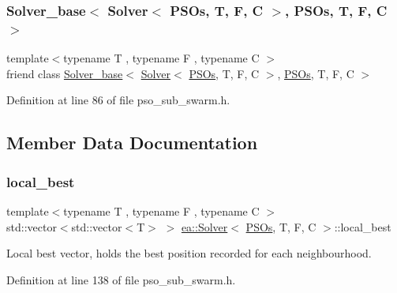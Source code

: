 \subsubsection{\texorpdfstring{Solver\+\_\+base$<$ Solver$<$ P\+S\+Os, T, F, C $>$, P\+S\+Os, T, F, C $>$}{Solver\_base< Solver< PSOs, T, F, C >, PSOs, T, F, C >}}
{\footnotesize\ttfamily template$<$typename T , typename F , typename C $>$ \\
friend class \hyperlink{classea_1_1_solver__base}{Solver\+\_\+base}$<$ \hyperlink{classea_1_1_solver}{Solver}$<$ \hyperlink{structea_1_1_p_s_os}{P\+S\+Os}, T, F, C $>$, \hyperlink{structea_1_1_p_s_os}{P\+S\+Os}, T, F, C $>$\hspace{0.3cm}{\ttfamily [friend]}}



Definition at line 86 of file pso\+\_\+sub\+\_\+swarm.\+h.



\subsection{Member Data Documentation}
\mbox{\label{classea_1_1_solver_3_01_p_s_os_00_01_t_00_01_f_00_01_c_01_4_afa2eb13f0e5028ba4aa96f7e29b62e9c}} 
\subsubsection{\texorpdfstring{local\+\_\+best}{local\_best}}
{\footnotesize\ttfamily template$<$typename T , typename F , typename C $>$ \\
std\+::vector$<$std\+::vector$<$T$>$ $>$ \hyperlink{classea_1_1_solver}{ea\+::\+Solver}$<$ \hyperlink{structea_1_1_p_s_os}{P\+S\+Os}, T, F, C $>$\+::local\+\_\+best\hspace{0.3cm}{\ttfamily [private]}}



Local best vector, holds the best position recorded for each neighbourhood. 



Definition at line 138 of file pso\+\_\+sub\+\_\+swarm.\+h.

\mbox{\label{classea_1_1_solver_3_01_p_s_os_00_01_t_00_01_f_00_01_c_01_4_a192926bdbed79d0cd68867c4f695cd92}} 

